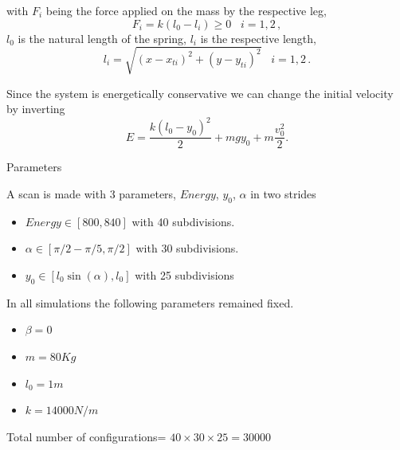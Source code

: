 \documentclass{beamer}
\begin{document}
\begin{frame}

with $F_i$ being the force applied on the mass by the respective leg,
\begin{equation}
  F_i=k(l_0-l_i)\geq 0 \,\,\,\,\, i=1,2\,,
\end{equation}
$l_0$ is the natural length of the spring, $l_i$ is the respective length,
\begin{equation}
l_i=\sqrt{(x-x_{ti})^2+(y-y_{ti})^2} \,\,\,\,\, i =1,2 \,.
\end{equation}

Since the system is energetically conservative we can change the initial velocity by inverting
  \begin{equation}
  E=\frac{k (l_0-y_0)^2}{2} + m g y_0 + m \frac{v_0^2}{2}.
\end{equation}

\end{frame}


\begin{frame}{Parameters}

    \begin{block}{A scan is made with 3 parameters, $Energy$, $y_0$, $\alpha$ in two strides}
    \begin{itemize}
\item $Energy \in  [800,840]$ with 40 subdivisions.

\item  $\alpha \in [\pi/2-\pi/5,\pi/2]$ with 30 subdivisions.

\item  $y_0 \in [l_0\sin(\alpha) ,l_0]$ with 25 subdivisions
    \end{itemize}
\end{block}
  In all simulations the following parameters remained fixed.
  \begin{itemize}
    
\item $\beta=0$
  
\item  $m=80 Kg$
  
\item $l_0=1 m$

\item  $k=14000 N/m$

 \end{itemize}

Total number of configurations= $40 \times 30 \times 25 = 30000$

 
\end{frame}
\end{document}
